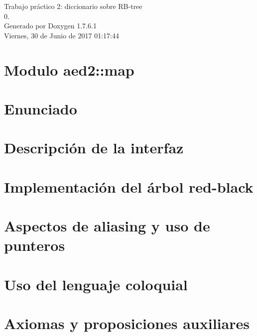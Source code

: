 \documentclass[a4paper]{article}
\begin{document}
\hypersetup{pageanchor=false,citecolor=blue}
\begin{titlepage}
\vspace*{7cm}
\begin{center}
{\Large \-Trabajo práctico 2\-: diccionario sobre \-R\-B-\/tree \\[1ex]\large 0. }\\
\vspace*{1cm}
{\large \-Generado por Doxygen 1.7.6.1}\\
\vspace*{0.5cm}
{\small Viernes, 30 de Junio de 2017 01:17:44}\\
\end{center}
\end{titlepage}
\tableofcontents
{}
\hypersetup{pageanchor=true,citecolor=blue}
\section{\-Modulo aed2\-:\-:map}
\label{index}\hypertarget{index}{}
\section{\-Enunciado}
\label{Enunciado}
\hypertarget{Enunciado}{}

\section{\-Descripción de la interfaz}
\label{Interfaz}
\hypertarget{Interfaz}{}

\section{\-Implementación del árbol red-\/black}
\label{Implementacion}
\hypertarget{Implementacion}{}

\section{\-Aspectos de aliasing y uso de punteros}
\label{Aliasing}
\hypertarget{Aliasing}{}

\section{\-Uso del lenguaje coloquial}
\label{Castellano}
\hypertarget{Castellano}{}

\section{\-Axiomas y proposiciones auxiliares}
\label{axiomas}
\hypertarget{axiomas}{}

\end{document}
